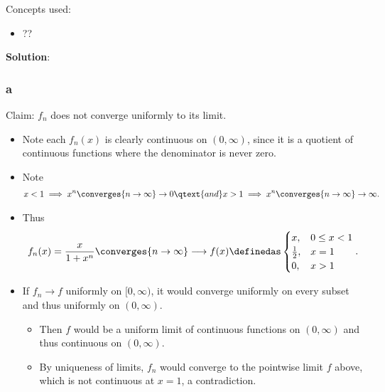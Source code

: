 \begin{solution}

Concepts used:

\begin{itemize}
\tightlist
\item
  ??
\end{itemize}

\textbf{Solution}:

\hypertarget{a-11}{%
\subsubsection{a}\label{a-11}}

Claim: \(f_n\) does not converge uniformly to its limit.

\begin{itemize}
\item
  Note each \(f_n(x)\) is clearly continuous on \((0, \infty)\), since
  it is a quotient of continuous functions where the denominator is
  never zero.
\item
  Note
  \begin{align*}
  x < 1 \implies x^n \converges{n\to\infty}\to 0\qtext{and} x>1 \implies x^n \converges{n\to\infty}\to \infty
  .\end{align*}
\item
  Thus
  \begin{align*}
  f_n(x) = \frac{x}{1+ x^n}\converges{n\to\infty}\longrightarrow
  f(x) \definedas
  \begin{cases}
  x, & 0 \leq x < 1 \\
  \frac 1 2, & x = 1 \\
  0, & x > 1 \\
  \end{cases}
  .\end{align*}
\item
  If \(f_n \to f\) uniformly on \([0, \infty)\), it would converge
  uniformly on every subset and thus uniformly on \((0, \infty)\).

  \begin{itemize}
  \tightlist
  \item
    Then \(f\) would be a uniform limit of continuous functions on
    \((0, \infty)\) and thus continuous on \((0, \infty)\).
  \item
    By uniqueness of limits, \(f_n\) would converge to the pointwise
    limit \(f\) above, which is not continuous at \(x=1\), a
    contradiction.
  \end{itemize}
\end{itemize}


\end{solution}
